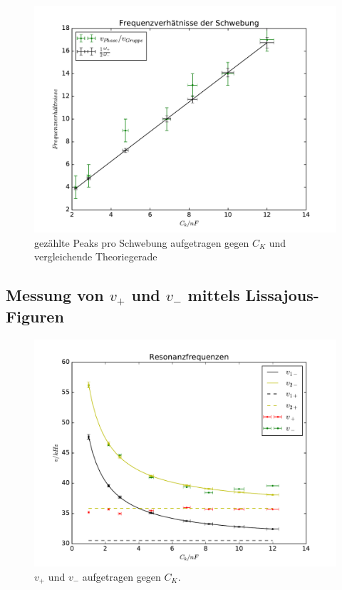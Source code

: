 \begin{figure}
  \centering
  \includegraphics[width=\textwidth]{./plots/freq-ratio.pdf}
  \caption{gezählte Peaks pro Schwebung aufgetragen gegen $C_K$  und vergleichende Theoriegerade}
  \label{fig:verhaeltnisse}
\end{figure}
\FloatBarrier

\subsection{Messung von $v_+$ und $v_-$ mittels Lissajous-Figuren}
\label{sec:Messung-v}


\begin{figure}
  \centering
  \includegraphics[width=\textwidth]{./plots/resonance.pdf}
  \caption{$v_+$ und $v_-$ aufgetragen gegen $C_K$.}
  \label{fig:frequenzen}
\end{figure}
\FloatBarrier

